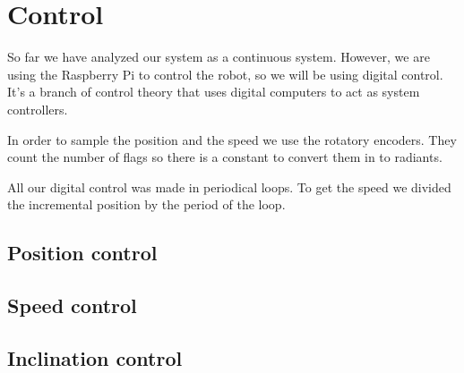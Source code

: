\section{Control}
So far we have analyzed our system as a continuous system.
However, we are using the Raspberry Pi to control the robot, so we will
be using digital control. It's a branch of control theory that uses
digital computers to act as system controllers.

In order to sample the position and the speed we use the rotatory encoders.
They count the number of flags so there is a constant to convert them in to radiants.

All our digital control was made in periodical loops. To get the speed we
divided the incremental position by the period of the loop.

\subsection{Position control}

\subsection{Speed control}

\subsection{Inclination control}
